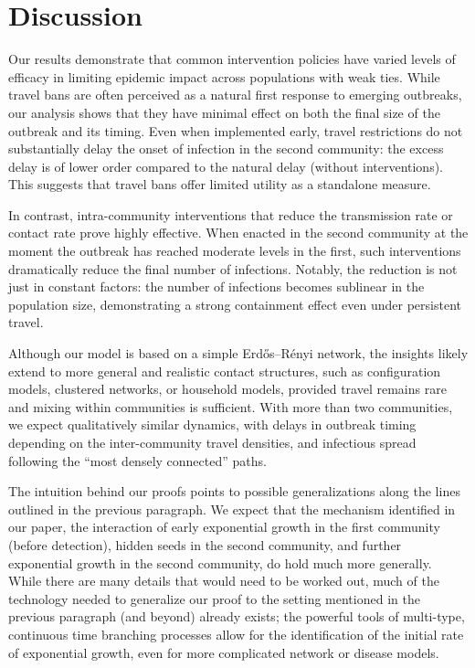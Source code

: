 \documentclass[11pt]{article}
\begin{document}
\section{Discussion}

Our results demonstrate that common intervention policies have varied levels of efficacy in limiting epidemic impact across populations with weak ties. While travel bans are often perceived as a natural first response to emerging outbreaks, our analysis shows that they have minimal effect on both the final size of the outbreak and its timing. Even when implemented early, travel restrictions do not substantially delay the onset of infection in the second community: the excess delay is of lower order compared to the natural delay (without interventions). This suggests that travel bans offer limited utility as a standalone measure.

In contrast, intra-community interventions that reduce the transmission rate or contact rate prove highly effective. When enacted in the second community at the moment the outbreak has reached moderate levels in the first, such interventions dramatically reduce the final number of infections. Notably, the reduction is not just in constant factors: the number of infections becomes sublinear in the population size, demonstrating a strong containment effect even under persistent travel.


Although our model is based on a simple Erd\H{o}s--R\'enyi network, the insights likely extend to more general and realistic contact structures, such as configuration models, clustered networks, or household models, provided travel remains rare and mixing within communities is sufficient. With more than two communities, we expect qualitatively similar dynamics, with delays in outbreak timing depending on the inter-community travel densities, and infectious spread following the ``most densely connected'' paths. 

The intuition behind our proofs points to possible generalizations along the lines outlined in the previous paragraph.  We expect that the mechanism identified in our paper, the interaction of early exponential growth in the first community (before detection), hidden seeds in the second community, and further exponential growth in the second community, do hold much more generally. While there are many details that would need to be worked out, much of the technology needed to generalize our proof to the setting mentioned in the previous paragraph (and beyond) already exists; the powerful tools of multi-type, continuous time branching processes allow for the identification of the initial rate of exponential growth, even for more complicated network or disease models.
\end{document}
